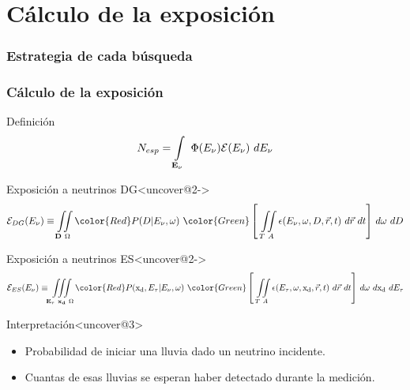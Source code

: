 \section[Exposicion]{C\'alculo de la exposici\'on}

\begin{frame}
 \frametitle{Estrategia de cada b\'usqueda}
 \begin{center}
 \end{center}
\end{frame}

\begin{frame}
 \frametitle{C\'alculo de la exposici\'on}\footnotesize
 
 \begin{exampleblock}{Definici\'on}
 \begin{displaymath}
 N_{esp}=\int\limits_{\mathbf{E_{\nu}}}~\Phi(E_{\nu}){\cal E}(E_\nu)~dE_\nu
 \end{displaymath}
 \end{exampleblock}

 \begin{block}{Exposici\'on a neutrinos DG}<uncover@2->
 \scriptsize
	\begin{displaymath}
	 {\cal E}_{DG}(E_\nu)\equiv\iint\limits_{\mathbf{D}~\Omega}
	 {\color{Red}
	 P(D|E_{\nu},\omega)~
	 }
	 {\color{Green}
	 \left[~
	 \iint\limits_{T~A}\epsilon(E_{\nu},\omega,D,\vec{r},t)~d\vec{r}~dt
	 \right]
	 }
	 ~d\omega~dD
	\end{displaymath}
 \end{block}
 \begin{block}{Exposici\'on a neutrinos ES}<uncover@2->
 \scriptsize
	\begin{displaymath}
	 {\cal E}_{ES}(E_\nu)\equiv\iiint\limits_{\mathbf{E_\tau}~\mathbf{x_d}~\Omega}
	 {\color{Red}
	 P({\rm x_d},E_\tau|E_{\nu},\omega)~
	 }
	 {\color{Green}
	 \left[~
	 \iint\limits_{T~A}\epsilon(E_\tau,\omega,{\rm x_d},\vec{r},t)~d\vec{r}~dt
	 \right]
	 }
	 ~d\omega~d{\rm x_d}~dE_\tau
	\end{displaymath}
 \end{block}
 
 \begin{block}{Interpretaci\'on}<uncover@3>
	\begin{itemize}
	\item {\color{Red} Probabilidad de iniciar una lluvia dado un neutrino incidente.}
	\item {\color{Green} Cuantas de esas lluvias se esperan haber detectado durante la medici\'on.}
	\end{itemize}
 \end{block}
\end{frame}
